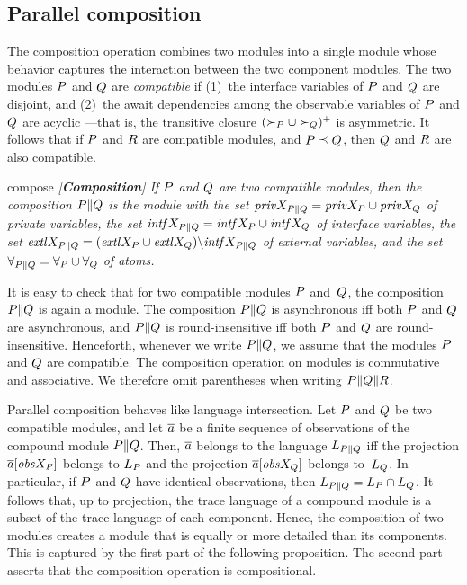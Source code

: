 \subsection{Parallel composition}

The composition operation combines two modules into a single module whose
behavior captures the interaction between the two component modules.
The two modules ${P}$ and ${Q}$ are {\em compatible\/} if
(1)~the interface variables of ${P}$ and ${Q}$ are disjoint, and
(2)~the await dependencies among the observable variables of ${P}$ and ${Q}$
  are acyclic
  ---that is, the transitive closure $(\succ_{P}\cup\succ_{Q})^+$ is
  asymmetric.
It follows that if ${P}$ and ${R}$ are compatible modules, and
${P}\preceq{Q}$, then ${Q}$ and ${R}$ are also compatible.

\begin{definition}{compose}\it
  {\em [{\bf Composition\/}]}
  If ${P}$ and ${Q}$ are two compatible modules, then the
  {\em composition\/} ${P}\|{Q}$ is the module with the set
  ${\it priv}X_{{P}\|{Q}}={\it priv}X_{{P}}\cup{\it priv}X_{{Q}}$ of private variables, the set
  ${\it intf}X_{{P}\|{Q}}={\it intf}X_{{P}}\cup{\it intf}X_{{Q}}$ of interface variables, the set
  ${\it extl}X_{{P}\|{Q}}=({\it extl}X_{{P}}\cup{\it extl}X_{{Q}})\backslash{\it intf}X_{{P}\|{Q}}$ of
  external variables, and the set
  $\forall_{{P}\|{Q}}=\forall_{{P}}\cup\forall_{{Q}}$ of atoms.
\end{definition}

\mypar
It is easy to check that for two compatible modules ${P}$ and~${Q}$, the
composition ${P}\|{Q}$ is again a module.
The composition ${P}\|{Q}$ is asynchronous iff both ${P}$ and ${Q}$ are
asynchronous, and ${P}\|{Q}$ is round-insensitive iff both ${P}$ and ${Q}$
are round-insensitive.
Henceforth, whenever we write ${P}\|{Q}$, we assume that the modules ${P}$
and ${Q}$ are compatible.
The composition operation on modules is commutative and associative.
We therefore omit parentheses when writing ${P}\|{Q}\|{R}$.

\mypar
Parallel composition behaves like language intersection.
Let ${P}$ and ${Q}$ be two compatible modules, and let $\overline{a}$ be a finite
sequence of observations of the compound module ${P}\|{Q}$.
Then, $\overline{a}$ belongs to the language $L_{{P}\|{Q}}$ iff the
projection $\overline{a}[{\it obs}X_{{P}}]$ belongs to $L_{{P}}$ and the projection
$\overline{a}[{\it obs}X_{{Q}}]$ belongs to~$L_{{Q}}$.
In particular, if ${P}$ and ${Q}$ have identical observations, then
$L_{{P}\|{Q}}=L_{{P}}\cap L_{{Q}}$.
It follows that, up to projection, the trace language of a compound module is
a subset of the trace language of each component.
Hence, the composition of two modules creates a module that is equally or
more detailed than its components.
This is captured by the first part of the following proposition.
The second part asserts that the composition operation is compositional.

